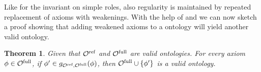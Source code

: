 \documentclass[
]{ceurart}
\newtheorem{theorem}{Theorem}
\begin{document}

Like for the invariant on simple roles, also regularity is maintained by repeated replacement of axioms with weakenings. With the help of  and  we can now sketch a proof showing that adding weakened axioms to a \SROIQ ontology will yield another valid \SROIQ ontology.

\begin{theorem} \label{lem:global-constraints}
  Given that ${\mathcal{O}^\textnormal{ref}}$ and ${\mathcal{O}^\textnormal{full}}$ are valid \SROIQ ontologies. For every axiom $\phi \in {\mathcal{O}^\textnormal{full}}$, if $\phi' \in g_{{\mathcal{O}^\textnormal{ref}},{\mathcal{O}^\textnormal{full}}}(\phi)$, then ${\mathcal{O}^\textnormal{full}} \cup \{ \phi' \}$ is a valid \SROIQ ontology.
\end{theorem}

\end{document}
